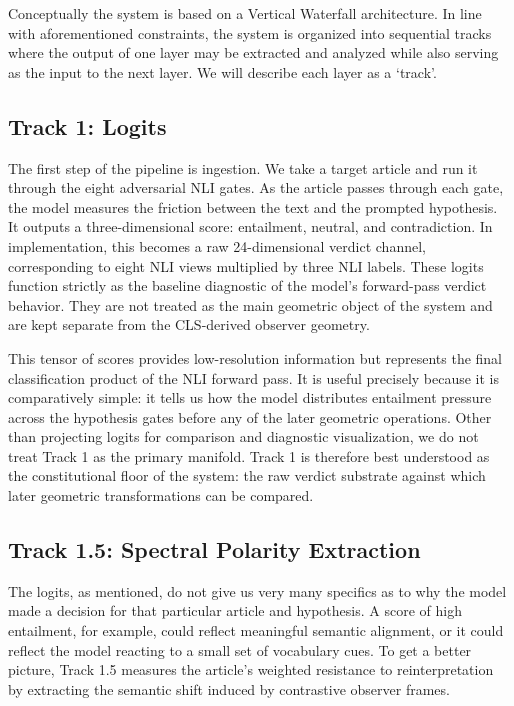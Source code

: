 Conceptually the system is based on a Vertical Waterfall architecture. In line with aforementioned constraints, the system is organized into sequential tracks where the output of one layer may be extracted and analyzed while also serving as the input to the next layer. We will describe each layer as a `track'.

\subsection{Track 1: Logits}

The first step of the pipeline is ingestion. We take a target article and run it through the eight adversarial NLI gates. As the article passes through each gate, the model measures the friction between the text and the prompted hypothesis. It outputs a three-dimensional score: entailment, neutral, and contradiction. In implementation, this becomes a raw 24-dimensional verdict channel, corresponding to eight NLI views multiplied by three NLI labels. These logits function strictly as the baseline diagnostic of the model's forward-pass verdict behavior. They are not treated as the main geometric object of the system and are kept separate from the CLS-derived observer geometry.

This tensor of scores provides low-resolution information but represents the final classification product of the NLI forward pass. It is useful precisely because it is comparatively simple: it tells us how the model distributes entailment pressure across the hypothesis gates before any of the later geometric operations. Other than projecting logits for comparison and diagnostic visualization, we do not treat Track 1 as the primary manifold. Track 1 is therefore best understood as the constitutional floor of the system: the raw verdict substrate against which later geometric transformations can be compared.

\subsection{Track 1.5: Spectral Polarity Extraction}

The logits, as mentioned, do not give us very many specifics as to why the model made a decision for that particular article and hypothesis. A score of high entailment, for example, could reflect meaningful semantic alignment, or it could reflect the model reacting to a small set of vocabulary cues. To get a better picture, Track 1.5 measures the article's weighted resistance to reinterpretation by extracting the semantic shift induced by contrastive observer frames.


